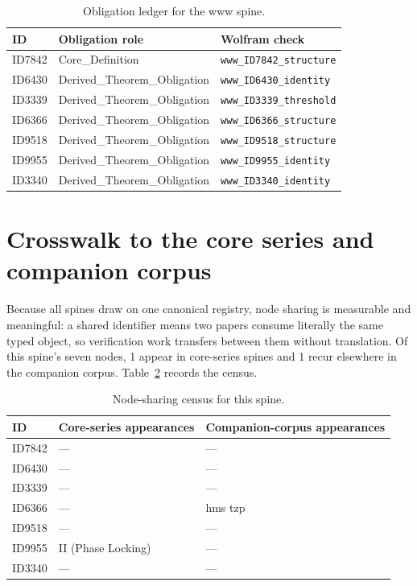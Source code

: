 \documentclass[11pt]{article}
\theoremstyle{remark}
\begin{document}
\begin{table}[ht]
\centering
\small
\caption{Obligation ledger for the www spine.}
\label{tab:obligations}
\begin{tabular}{llp{6.2cm}}
\toprule
ID & Obligation role & Wolfram check \\
\midrule
ID7842 & Core\_Definition & \texttt{www\_ID7842\_structure} \\
ID6430 & Derived\_Theorem\_Obligation & \texttt{www\_ID6430\_identity} \\
ID3339 & Derived\_Theorem\_Obligation & \texttt{www\_ID3339\_threshold} \\
ID6366 & Derived\_Theorem\_Obligation & \texttt{www\_ID6366\_structure} \\
ID9518 & Derived\_Theorem\_Obligation & \texttt{www\_ID9518\_structure} \\
ID9955 & Derived\_Theorem\_Obligation & \texttt{www\_ID9955\_identity} \\
ID3340 & Derived\_Theorem\_Obligation & \texttt{www\_ID3340\_identity} \\
\bottomrule
\end{tabular}
\end{table}

\section{Crosswalk to the core series and companion corpus}
\label{sec:crosswalk}

Because all spines draw on one canonical registry, node sharing is measurable and meaningful: a shared identifier means two papers consume literally the same typed object, so verification work transfers between them without translation. Of this spine's seven nodes, 1 appear in core-series spines and 1 recur elsewhere in the companion corpus. Table~\ref{tab:crosswalk} records the census.

\begin{table}[ht]
\centering
\small
\caption{Node-sharing census for this spine.}
\label{tab:crosswalk}
\begin{tabular}{lp{4.4cm}p{6.6cm}}
\toprule
ID & Core-series appearances & Companion-corpus appearances \\
\midrule
ID7842 & --- & --- \\
ID6430 & --- & --- \\
ID3339 & --- & --- \\
ID6366 & --- & hms tzp \\
ID9518 & --- & --- \\
ID9955 & II (Phase Locking) & --- \\
ID3340 & --- & --- \\
\bottomrule
\end{tabular}
\end{table}
\end{document}
